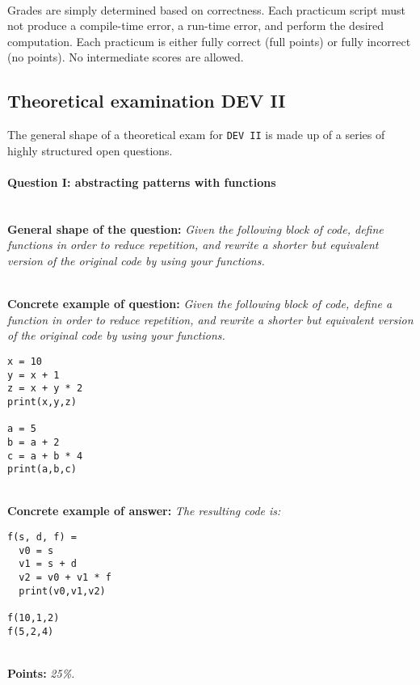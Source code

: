 \documentclass[12pt,a4paper,final]{article}
\begin{document}
\ \\

Grades are simply determined based on correctness. Each practicum script must not produce a compile-time error, a run-time error, and perform the desired computation. Each practicum is either fully correct (full points) or fully incorrect (no points). No intermediate scores are allowed.

\subsection{Theoretical examination DEV II}
The general shape of a theoretical exam for \texttt{DEV II} is made up of a series of highly structured open questions.


\paragraph{Question I: abstracting patterns with functions} \ \\

\textbf{General shape of the question:} \textit{Given the following block of code, define functions in order to reduce repetition, and rewrite a shorter but equivalent version of the original code by using your functions.}

\ \\ 

\textbf{Concrete example of question:} \textit{Given the following block of code, define a function in order to reduce repetition, and rewrite a shorter but equivalent version of the original code by using your functions.}

\begin{lstlisting}
x = 10
y = x + 1
z = x + y * 2
print(x,y,z)

a = 5
b = a + 2
c = a + b * 4
print(a,b,c)
\end{lstlisting}

\ \\ 

\textbf{Concrete example of answer:} \textit{The resulting code is:}

\begin{lstlisting}
f(s, d, f) =
  v0 = s
  v1 = s + d
  v2 = v0 + v1 * f
  print(v0,v1,v2)

f(10,1,2) 
f(5,2,4) 
\end{lstlisting}

\ \\ 

\textbf{Points:} \textit{25\%.}
\end{document}
